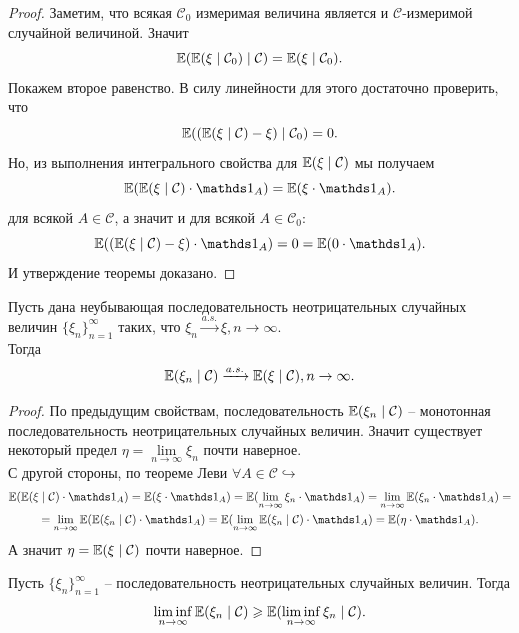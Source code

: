 \begin{proof}
    Заметим, что всякая $\mathcal{C}_0$ измеримая величина является и $\mathcal{C}$-измеримой случайной величиной. Значит 
    \[
        \mathbb{E}(\mathbb{E}(\xi \mid \mathcal{C}_0) \mid \mathcal{C}) = \mathbb{E}(\xi \mid \mathcal{C}_0).
    \]
    Покажем второе равенство. В силу линейности для этого достаточно проверить, что 
    \[
        \mathbb{E}((\mathbb{E}(\xi \mid \mathcal{C}) - \xi) \mid \mathcal{C}_0) = 0.
    \]
    Но, из выполнения интегрального свойства для $\mathbb{E}(\xi \mid \mathcal{C})$ мы получаем 
    \[
        \Ex(\Ex(\xi \mid \mathcal{C} ) \cdot \Ind_{A}) = \Ex(\xi \cdot \Ind_{A}).
    \]
    для всякой $A \in \mathcal{C}$, а значит и для всякой $A \in \mathcal{C}_0$:
    \[
        \Ex((\Ex(\xi \mid \mathcal{C}) - \xi) \cdot \Ind_{A}) = 0 = \Ex(0 \cdot \Ind_{A}).
    \]
    И утверждение теоремы доказано.
\end{proof}
\begin{theorem}
    Пусть дана неубывающая последовательность неотрицательных случайных величин $\{\xi_n\}_{n = 1}^{\infty}$ таких, что $\xi_n \xrightarrow{a.s.} \xi, n \rightarrow \infty$. \\
    Тогда 
    \[
        \mathbb{E}(\xi_n \mid \mathcal{C}) \xrightarrow{a.s.} \mathbb{E}(\xi \mid \mathcal{C}), n \rightarrow \infty.
    \]
\end{theorem}
\begin{proof}
    По предыдущим свойствам, последовательность $\mathbb{E}(\xi_n \mid \mathcal{C})$ -- монотонная последовательность неотрицательных случайных величин. Значит существует некоторый предел $\eta = \lim\limits_{n \rightarrow \infty} \xi_n$ почти наверное. \\
    С другой стороны, по теореме Леви $\forall A \in \mathcal{C} \hookrightarrow$ 
    \begin{multline*}
        \Ex(\Ex(\xi \mid \mathcal{C}) \cdot \Ind_{A}) = \Ex(\xi \cdot \Ind_{A}) = \Ex(\lim\limits_{n \rightarrow \infty} \xi_n \cdot \Ind_{A}) = \lim\limits_{n \rightarrow \infty} \Ex(\xi_n \cdot \Ind_{A}) = \\ =
        \lim\limits_{n \rightarrow \infty} \Ex(\Ex(\xi_n \mid \mathcal{C}) \cdot \Ind_{A}) = \Ex(\lim\limits_{n \rightarrow \infty} \Ex(\xi_n \mid \mathcal{C}) \cdot \Ind_{A}) = \Ex(\eta \cdot \Ind_{A}).
    \end{multline*}
    А значит $\eta = \mathbb{E}(\xi \mid \mathcal{C})$ почти наверное.
\end{proof}
\begin{lemma}
    Пусть $\{\xi_n\}_{n = 1}^{\infty}$ -- последовательность неотрицательных случайных величин. Тогда
    \[
        \liminf\limits_{n \rightarrow \infty} \mathbb{E}(\xi_n \mid \mathcal{C}) \geqslant \mathbb{E}(\liminf\limits_{n \rightarrow \infty} \xi_n \mid \mathcal{C}).
    \]
\end{lemma}
